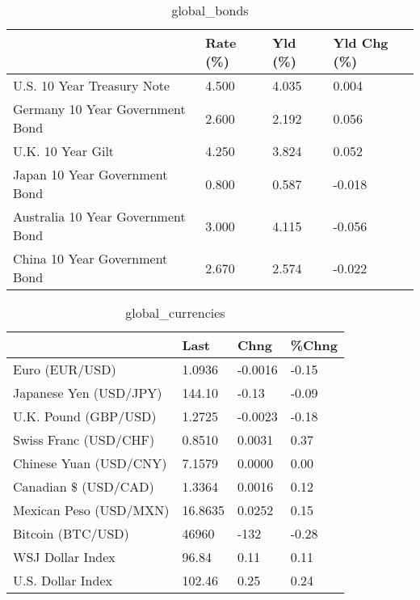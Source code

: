 \documentclass{article}%
\begin{document}
%


\begin{table}[htbp]%
\caption{global\_bonds}%
\centering%
\begin{adjustbox}{width=1\textwidth}%
\begin{tabular}{llll}
\toprule
                                  & Rate (\%) & Yld (\%) & Yld Chg (\%) \\
\midrule
       U.S. 10 Year Treasury Note &    4.500 &   4.035 &       0.004 \\
  Germany 10 Year Government Bond &    2.600 &   2.192 &       0.056 \\
                U.K. 10 Year Gilt &    4.250 &   3.824 &       0.052 \\
    Japan 10 Year Government Bond &    0.800 &   0.587 &      -0.018 \\
Australia 10 Year Government Bond &    3.000 &   4.115 &      -0.056 \\
    China 10 Year Government Bond &    2.670 &   2.574 &      -0.022 \\
\bottomrule
\end{tabular}
%
\end{adjustbox}%
\end{table}

%


\begin{table}[htbp]%
\caption{global\_currencies}%
\centering%
\begin{adjustbox}{width=1\textwidth}%
\begin{tabular}{llll}
\toprule
                       &    Last &    Chng & \%Chng \\
\midrule
        Euro (EUR/USD) &  1.0936 & -0.0016 & -0.15 \\
Japanese Yen (USD/JPY) &  144.10 &   -0.13 & -0.09 \\
  U.K. Pound (GBP/USD) &  1.2725 & -0.0023 & -0.18 \\
 Swiss Franc (USD/CHF) &  0.8510 &  0.0031 &  0.37 \\
Chinese Yuan (USD/CNY) &  7.1579 &  0.0000 &  0.00 \\
  Canadian \$ (USD/CAD) &  1.3364 &  0.0016 &  0.12 \\
Mexican Peso (USD/MXN) & 16.8635 &  0.0252 &  0.15 \\
     Bitcoin (BTC/USD) &   46960 &    -132 & -0.28 \\
      WSJ Dollar Index &   96.84 &    0.11 &  0.11 \\
     U.S. Dollar Index &  102.46 &    0.25 &  0.24 \\
\bottomrule
\end{tabular}
%
\end{adjustbox}%
\end{table}
\end{document}
